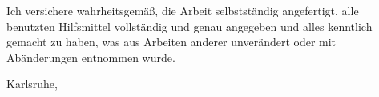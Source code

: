 \affirmation

Ich versichere wahrheitsgemäß, die Arbeit selbstständig angefertigt, alle benutzten Hilfsmittel vollständig und genau angegeben und alles kenntlich gemacht zu haben, was aus Arbeiten anderer unverändert oder mit Abänderungen entnommen wurde.

\vspace{2cm}
\begin{flushright}\noindent
    Karlsruhe,\hfill {\it \editorx}\\
    \releasemonth \hfill { }
\end{flushright}